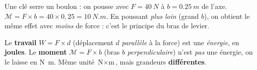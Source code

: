 \documentclass[11pt,a4paper]{article}
\begin{document}
\begin{exemplebox}
Une clé serre un boulon : on pousse avec $F=\qty{40}{N}$ à $b=\qty{0.25}{m}$ de l'axe.
$\mathcal{M}=F\times b = 40\times 0{,}25 = \qty{10}{N.m}$. En poussant \emph{plus loin} (grand $b$), on
obtient le même effet avec \emph{moins} de force : c'est le principe du bras de levier.
\end{exemplebox}

\begin{piege}
Le \textbf{travail} $W=F\times d$ (déplacement $d$ \emph{parallèle} à la force) est une \emph{énergie},
en \textbf{joules}. Le \textbf{moment} $\mathcal{M}=F\times b$ (bras $b$ \emph{perpendiculaire}) n'est
\emph{pas} une énergie, on le laisse en \si{\newton\metre}. Même unité $\si{\newton}\times\si{\metre}$,
mais grandeurs \textbf{différentes}.
\end{piege}
\end{document}
